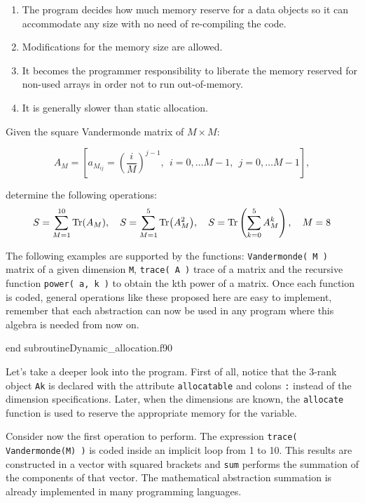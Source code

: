 \begin{enumerate}
    \item The program decides how much memory reserve for a data objects so it can accommodate any size with no need of re-compiling the code.
    \item Modifications for the memory size are allowed. 
    \item It becomes the programmer responsibility to liberate the memory reserved for non-used arrays in order not to run out-of-memory.
    \item It is generally slower than static allocation. 
\end{enumerate}




Given the square Vandermonde matrix  of $ M \times M $:

$$
A_M =  \left[ a_{ M_{ij} } = \left( \frac{i}{M} \right)^{j-1}, \ \ i = 0, \ldots M-1, \ \  j=0, \ldots M-1 \right],  
$$

determine the following operations:
$$ 
    S = \sum_{M=1} ^{10} \Tr(A_M),  \quad
    S = \sum_{M=1} ^{5} \Tr(A_M^2), \quad
    S = \Tr \left( \sum_{k=0} ^{5} A_M^k  \right),  \quad  M=8 
$$

The following examples are supported by the functions: \texttt{Vandermonde( M )} matrix of a given dimension \texttt{M}, \texttt{trace( A )} trace of a matrix and the recursive function \texttt{power( a, k )} to obtain the kth power of a matrix. Once each function is coded, general operations like these proposed here are easy to implement, remember that each abstraction can now be used in any program where this algebra is needed from now on. 

{end subroutine}{Dynamic_allocation.f90}


Let's take a deeper look into the program. First of all, notice that the 3-rank object \texttt{Ak} is declared with the attribute \texttt{allocatable} and colons \texttt{:} instead of the dimension specifications. Later, when the dimensions are known, the \texttt{allocate} function is used to reserve the appropriate memory for the variable.

Consider now the first operation to perform. The expression \texttt{trace( Vandermonde(M) )} is coded inside an implicit loop from 1 to 10. This results are constructed in a vector with squared brackets and \texttt{sum} performs the summation of the components of that vector. The mathematical abstraction summation is already implemented in many programming languages. 

